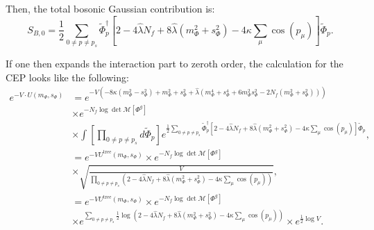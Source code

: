 Then, the total bosonic Gaussian contribution is:
\begin{equation}\label{eq:CEP_alternative_bosonic_Gaussian_contribution}
 S_{B,0} = \frac{1}{2}  \sum\limits_{0\neq p \neq p_s}  \tilde\Phi_p^{\dagger}  
              \left[ 2 - 4 \hat\lambda N_f + 8 \hat\lambda \left( m_{\Phi}^2 + s_{\Phi}^2  \right) - 4 \kappa \sum_{\mu} \cos(p_{\mu}) \right]  \tilde\Phi_p.
\end{equation}

If one then expands the interaction part to zeroth order, the calculation for the CEP looks like the following:
\begin{align}\label{eq:deriv_of_bosDet_step1}
 e^{-V\cdot U(m_{\Phi}, s_{\Phi})} &= 
           e^{-V\left(
             -8 \kappa \left( m_{\Phi}^2 - s_{\Phi}^2 \right)  +  m_{\Phi}^2 + s_{\Phi}^2 
             + \hat\lambda \left( m_{\Phi}^4 + s_{\Phi}^4 + 6 m_{\Phi}^2s_{\Phi}^2 - 2 N_f \left(m_{\Phi}^2 + s_{\Phi}^2\right) \right) \right)} 
             \nonumber \\
             &\times e^{-N_f \log \det \mathcal{M}[\Phi^g]} 
             \nonumber \\
             &\times \int \left[\prod\limits_{0 \neq p \neq p_s}  d \tilde \Phi_p \right] 
              e^{ \frac{1}{2}  \sum\limits_{0\neq p \neq p_s}  \tilde\Phi_p^{\dagger}  
              \left[ 2 - 4 \hat\lambda N_f + 8 \hat\lambda \left( m_{\Phi}^2 + s_{\Phi}^2  \right) - 4 \kappa \sum_{\mu} \cos(p_{\mu}) \right]  \tilde\Phi_p}, 
          \\ \label{eq:deriv_of_bosDet_step2}
          &= e^{-V U^{\text{tree}}(m_{\Phi}, s_{\Phi})} \times e^{-N_f \log \det \mathcal{M}[\Phi^g]} 
          \nonumber \\
          & \times \sqrt{\frac{V}{\prod\limits_{0 \neq p \neq p_s} 
             \left(  2 - 4 \hat\lambda N_f + 8 \hat\lambda \left( m_{\Phi}^2 + s_{\Phi}^2  \right) - 4 \kappa \sum_{\mu} \cos(p_{\mu}) \right) }} ,
             \\\label{eq:deriv_of_bosDet_step3}
          &=  e^{-V U^{\text{tree}}(m_{\Phi}, s_{\Phi})} \times e^{-N_f \log \det \mathcal{M}[\Phi^g]} 
            \nonumber \\
          & \times e^{\sum\limits_{0 \neq p \neq p_s} 
          \frac{1}{2}\log\left( 2 - 4 \hat\lambda N_f + 8 \hat\lambda \left( m_{\Phi}^2 + s_{\Phi}^2  \right) - 4 \kappa \sum_{\mu} \cos(p_{\mu}) \right)}
            \times e^{\frac{1}{2}\log V}.
\end{align}
